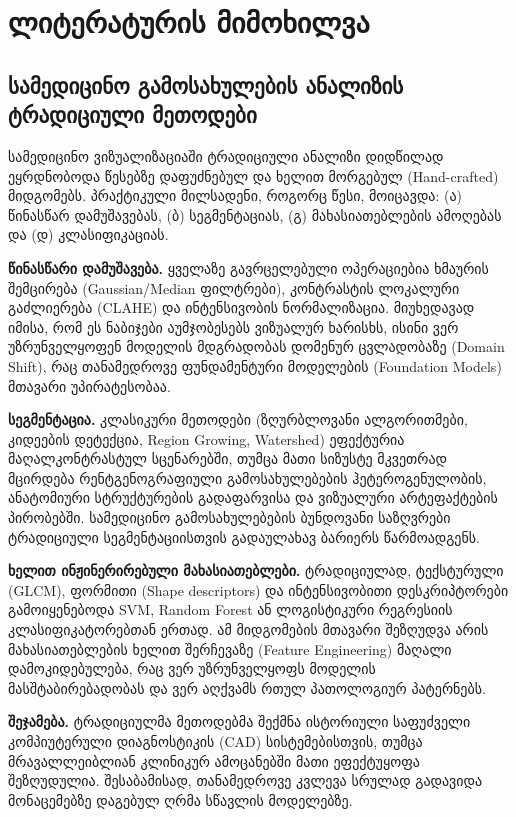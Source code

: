 \documentclass[12pt,a4paper,oneside]{report}
\begin{document}
\chapter{ლიტერატურის მიმოხილვა}

\section{სამედიცინო გამოსახულების ანალიზის ტრადიციული მეთოდები}
სამედიცინო ვიზუალიზაციაში ტრადიციული ანალიზი დიდწილად ეყრდნობოდა წესებზე დაფუძნებულ და ხელით მორგებულ (Hand-crafted) მიდგომებს. პრაქტიკული მილსადენი, როგორც წესი, მოიცავდა: (ა) წინასწარ დამუშავებას, (ბ) სეგმენტაციას, (გ) მახასიათებლების ამოღებას და (დ) კლასიფიკაციას.

\textbf{წინასწარი დამუშავება.}
ყველაზე გავრცელებული ოპერაციებია ხმაურის შემცირება (Gaussian/Median ფილტრები), კონტრასტის ლოკალური გაძლიერება (CLAHE) და ინტენსივობის ნორმალიზაცია. მიუხედავად იმისა, რომ ეს ნაბიჯები აუმჯობესებს ვიზუალურ ხარისხს, ისინი ვერ უზრუნველყოფენ მოდელის მდგრადობას დომენურ ცვლადობაზე (Domain Shift), რაც თანამედროვე ფუნდამენტური მოდელების (Foundation Models) მთავარი უპირატესობაა.

\textbf{სეგმენტაცია.}
კლასიკური მეთოდები (ზღურბლოვანი ალგორითმები, კიდეების დეტექცია, Region Growing, Watershed) ეფექტურია მაღალკონტრასტულ სცენარებში, თუმცა მათი სიზუსტე მკვეთრად მცირდება რენტგენოგრაფიული გამოსახულებების ჰეტეროგენულობის, ანატომიური სტრუქტურების გადაფარვისა და ვიზუალური არტეფაქტების პირობებში. სამედიცინო გამოსახულებების ბუნდოვანი საზღვრები ტრადიციული სეგმენტაციისთვის გადაულახავ ბარიერს წარმოადგენს.

\textbf{ხელით ინჟინერირებული მახასიათებლები.}
ტრადიციულად, ტექსტურული (GLCM), ფორმითი (Shape descriptors) და ინტენსივობითი დესკრიპტორები გამოიყენებოდა SVM, Random Forest ან ლოგისტიკური რეგრესიის კლასიფიკატორებთან ერთად. ამ მიდგომების მთავარი შეზღუდვა არის მახასიათებლების ხელით შერჩევაზე (Feature Engineering) მაღალი დამოკიდებულება, რაც ვერ უზრუნველყოფს მოდელის მასშტაბირებადობას და ვერ აღქვამს რთულ პათოლოგიურ პატერნებს.

\textbf{შეჯამება.}
ტრადიციულმა მეთოდებმა შექმნა ისტორიული საფუძველი კომპიუტერული დიაგნოსტიკის (CAD) სისტემებისთვის, თუმცა მრავალლეიბლიან კლინიკურ ამოცანებში მათი ეფექტუყოფა შეზღუდულია. შესაბამისად, თანამედროვე კვლევა სრულად გადავიდა მონაცემებზე დაგებულ ღრმა სწავლის მოდელებზე.
\end{document}
